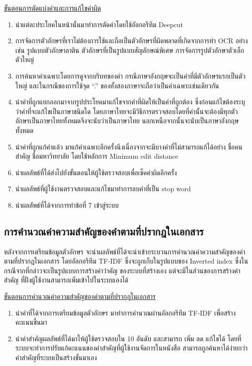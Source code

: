 \underline{ขั้นตอนการตัดแบ่งคำและการแก้ไขคำผิด}
\begin{enumerate}
    \item นำแต่ละประโยคในหน้านั้นมาทำการตัดคำโดยใช้อัลกอรึทึม Deepcut
    \item การจัดการตัวอักษรที่เราไม่ต้องการใช้และถือเป็นตัวอักษรที่ผิดพลาดที่เกิดจากการทำ OCR อย่างเช่น รูปแบบตัวอักษาลาติน ตัวอักษรที่เป็นรูปแบบสัญลักษณ์พิเศษ การจัดการรูปตัวอักษาตัวเล็กตัวใหญ่
    \item การค้นหาคำเฉพาะโดยการดูจากบริบทของคำ กรณีภาษาอังกฤษจะเป็นคำที่มีตัวอักษรแรกเป็นตัวใหญ่ และในกรณีของการใช้จุด “.” ของทั้งสองภาษาจะถือว่าเป็นคำเฉพาะเช่นเดียวกัน
    \item นำคำที่ถูกแยกออกมาจากรูปประโยคมาแก้ไขจากคำที่ผิดให้เป็นคำที่ถูกต้อง ซึ่งก่อนแก้ไขต้องระบุว่าคำที่จะแก้ไขเป็นภาษาชนิดใด โดยภาษาไทยจะมีวิธีการตรวจสอบโดยที่คำนั้นจะต้องมีทุกตัวอักษรเป็นภาษาไทยทั้งหมดจึงจะนับว่าเป็นภาษาไทย นอกเหนือจากนั้นจะนับเป็นภาษาอังกฤษทั้งหมด
    \item นำคำที่ถูกแก้คำแล้ว มาแก้คำเฉพาะอีกครั้งนึงเนื่องจากจะมีบางคำที่ไม่สามารถแก้ได้อย่าง ชื่อคนสำคัญ ชื่อมหาวิทยาลัย โดยใช้หลักการ Minimum edit distance
    \item นำผลลัพธ์ที่ได้ส่งไปยังขั้นตอนให้ผู้ใช้ตรวจสอบเพื่อเช็คคำผิดอีกครั้ง
    \item นำผลลัพธ์ที่ผู้ใช้งานตรวจสอบและแก้ไขมาทำการลบคำที่เป็น stop word
    \item นำผลลัพธ์ที่ได้จากการทำข้อที่ 7 เข้าสู่ระบบ

\end{enumerate}

\subsection{การคำนวณค่าความสำคัญของคำตามที่ปรากฎในเอกสาร}

หลังจากการเตรียมข้อมูลตัวอักษร จะนำผลลัพธ์ที่ได้จะนำเข้ากระบวนการคำนวณค่าความสำคัญของคำตามที่ปรากฎในเอกสาร โดยอัลกอรึทึม TF-IDF 
ซึ่งจะถูกเก็บในรูปแบบของ Inverted index ซึ่งในกรณีจากที่กล่าวจะเป็นรูปแบบการสร้างคำวำคัญ ของระบบที่สร้างเอง แต่จะมีในส่วนของการสร้างคำสำคัญ ที่ฝั่งผู้ใช้งานสามารถเพิ่มเข้าไปในระบบเองได้

\underline{ขั้นตอนการคำนวณค่าความสำคัญของคำตามที่ปรากฎในเอกสาร}
\begin{enumerate}
    \item นำคำที่ได้จากการเตรียมข้อมูลตัวอักษร มาทำการคำนวณผ่านอัลกอรึทึม TF-IDF เพื่อสร้างคะแนนขึ้นมา
    \item นำคำสำคัญผลลัพธ์ที่ได้มาให้ผู้ใช้ตรวจสอบใน 10 อันดับ และสามารถ เพิ่ม ลด แก้ไขได้ โดยที่ระบบจะทำการปรับแก้คะแนนของคำสำคัญที่ผู้ใช้งานจัดการในหนังสือ สามารถถูกค้นหาได้ง่ายกว่าคำสำคัญที่ระบบเป็นสร้างขั้นมาเอง
    
\end{enumerate}

